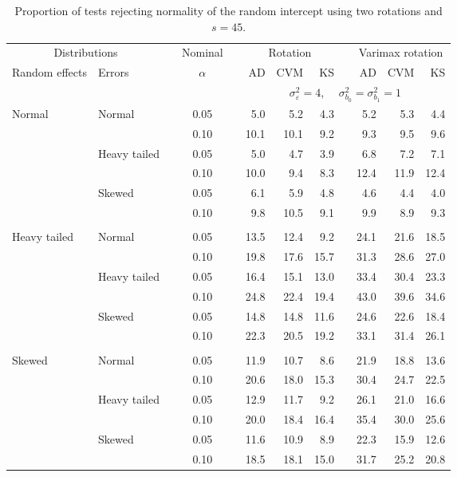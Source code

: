 \begin{table}[ht]
\centering
\caption{\label{tab:fixedsimb045} Proportion of tests rejecting normality of the random intercept using two rotations and $s = 45$.}
\begin{scriptsize}
\begin{tabular}{ll p{.1cm} c p{.1cm} rrr p{.1cm} rrr}
  \hline
  \multicolumn{2}{c}{Distributions}& & Nominal & &  \multicolumn{3}{c}{Rotation} & & \multicolumn{3}{c}{Varimax rotation} \\ \cline{1-2} \cline{6-8} \cline{10-12}   
  Random effects & Errors & & $\alpha$ & & AD & CVM & KS & & AD & CVM & KS \\ 
   \hline
& && && \multicolumn{7}{c}{$\sigma_{\varepsilon}^2 = 4$, \ \ $\sigma_{b_0}^2 = \sigma_{b_1}^2 = 1$} \\ \cline{6-12}
\rowcolor{gray!20} Normal & Normal &  & 0.05 &  & 5.0 & 5.2 & 4.3 &  & 5.2 & 5.3 & 4.4 \\ 
\rowcolor{gray!20}    &  &  & 0.10 &  & 10.1 & 10.1 & 9.2 &  & 9.3 & 9.5 & 9.6 \\ 
\rowcolor{gray!20}    & Heavy tailed &  & 0.05 &  & 5.0 & 4.7 & 3.9 &  & 6.8 & 7.2 & 7.1 \\ 
\rowcolor{gray!20}    &  &  & 0.10 &  & 10.0 & 9.4 & 8.3 &  & 12.4 & 11.9 & 12.4 \\ 
\rowcolor{gray!20}    & Skewed &  & 0.05 &  & 6.1 & 5.9 & 4.8 &  & 4.6 & 4.4 & 4.0 \\ 
\rowcolor{gray!20}    &  &  & 0.10 &  & 9.8 & 10.5 & 9.1 &  & 9.9 & 8.9 & 9.3 \\ 
&&&&&&&&&&&\\
  Heavy tailed & Normal &  & 0.05 &  & 13.5 & 12.4 & 9.2 &  & 24.1 & 21.6 & 18.5 \\ 
   &  &  & 0.10 &  & 19.8 & 17.6 & 15.7 &  & 31.3 & 28.6 & 27.0 \\ 
   & Heavy tailed &  & 0.05 &  & 16.4 & 15.1 & 13.0 &  & 33.4 & 30.4 & 23.3 \\ 
   &  &  & 0.10 &  & 24.8 & 22.4 & 19.4 &  & 43.0 & 39.6 & 34.6 \\ 
   & Skewed &  & 0.05 &  & 14.8 & 14.8 & 11.6 &  & 24.6 & 22.6 & 18.4 \\ 
   &  &  & 0.10 &  & 22.3 & 20.5 & 19.2 &  & 33.1 & 31.4 & 26.1 \\ 
&&&&&&&&&&&\\
  Skewed & Normal &  & 0.05 &  & 11.9 & 10.7 & 8.6 &  & 21.9 & 18.8 & 13.6 \\ 
   &  &  & 0.10 &  & 20.6 & 18.0 & 15.3 &  & 30.4 & 24.7 & 22.5 \\ 
   & Heavy tailed &  & 0.05 &  & 12.9 & 11.7 & 9.2 &  & 26.1 & 21.0 & 16.6 \\ 
   &  &  & 0.10 &  & 20.0 & 18.4 & 16.4 &  & 35.4 & 30.0 & 25.6 \\ 
   & Skewed &  & 0.05 &  & 11.6 & 10.9 & 8.9 &  & 22.3 & 15.9 & 12.6 \\ 
   &  &  & 0.10 &  & 18.5 & 18.1 & 15.0 &  & 31.7 & 25.2 & 20.8 \\ 


\end{tabular}
\end{scriptsize}
\end{table}
